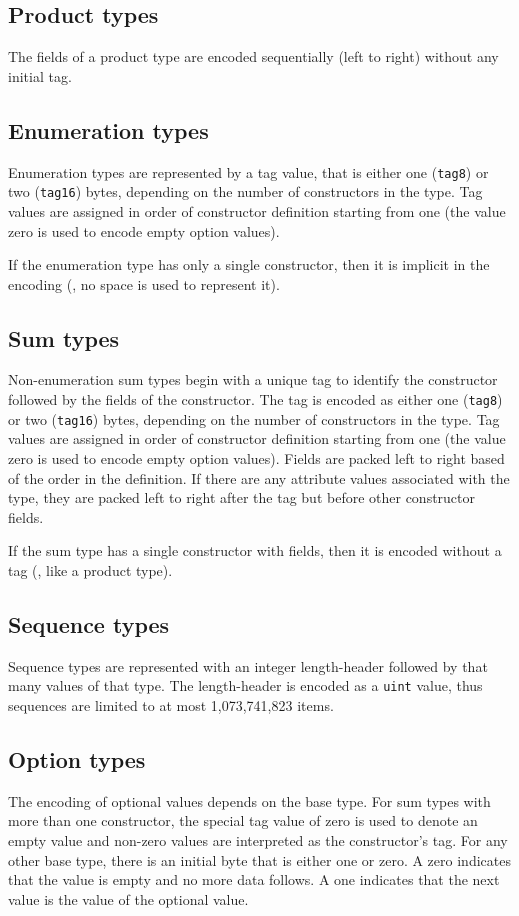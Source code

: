 \subsection{Product types}
The fields of a product type are encoded sequentially (left to right)
without any initial tag.

\subsection{Enumeration types}
Enumeration types are represented by a tag value, that is either
one (\lstinline!tag8!) or two (\lstinline!tag16!)
bytes, depending on the number of constructors in the type.
Tag values are assigned in order of constructor definition starting from one (the
value zero is used to encode empty option values).

If the enumeration type has only a single constructor, then it is implicit in
the encoding (\ie{}, no space is used to represent it).

\subsection{Sum types}
Non-enumeration sum types begin with a unique tag to identify the constructor
followed by the fields of the constructor.
The tag is encoded as either one (\lstinline!tag8!) or two (\lstinline!tag16!)
bytes, depending on the number of constructors in the type.
Tag values are assigned in order of constructor definition starting from one (the
value zero is used to encode empty option values).
Fields are packed left to right based of the order in the definition.
If there are any attribute values associated with the type, they are packed left to right
after the tag but before other constructor fields.
  
If the sum type has a single constructor with fields, then it is
encoded without a tag (\ie{}, like a product type).

\subsection{Sequence types}
Sequence types are represented with an integer length-header followed by
that many values of that type.
The length-header is encoded as a \lstinline!uint! value, thus sequences are limited
to at most 1,073,741,823 items.

\subsection{Option types}
The encoding of optional values depends on the base type.
For sum types with more than one constructor, the special tag value of zero is
used to denote an empty value and non-zero values are interpreted as
the constructor's tag.
For any other base type, there is an initial byte that is either one or zero.
A zero indicates that the value is empty and no more data follows.
A one indicates that the next value is the value of the optional value.

